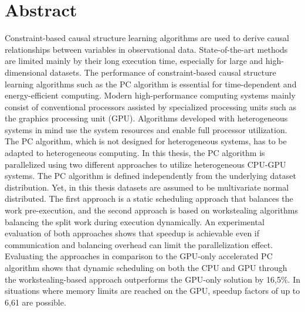 \chapter*{Abstract}
Constraint-based causal structure learning algorithms are used to derive causal relationships between variables in observational data. State-of-the-art methods are limited mainly by their long execution time, especially for large and high-dimensional datasets. The performance of constraint-based causal structure learning algorithms such as the PC algorithm is essential for time-dependent and energy-efficient computing. Modern high-performance computing systems mainly consist of conventional processors assisted by specialized processing units such as the graphics processing unit (GPU). Algorithms developed with heterogeneous systems in mind use the system resources and enable full processor utilization. The PC algorithm, which is not designed for heterogeneous systems, has to be adapted to heterogeneous computing. In this thesis, the PC algorithm is parallelized using two different approaches to utilize heterogeneous CPU-GPU systems. The PC algorithm is defined independently from the underlying dataset distribution. Yet, in this thesis datasets are assumed to be multivariate normal distributed. The first approach is a static scheduling approach that balances the work pre-execution, and the second approach is based on workstealing algorithms balancing the split work during execution dynamically. An experimental evaluation of both approaches shows that speedup is achievable even if communication and balancing overhead can limit the parallelization effect. Evaluating the approaches in comparison to the GPU-only accelerated PC algorithm shows that dynamic scheduling on both the CPU and GPU through the workstealing-based approach outperforms the GPU-only solution by 16,5\%. In situations where memory limits are reached on the GPU, speedup factors of up to 6,61 are possible.
